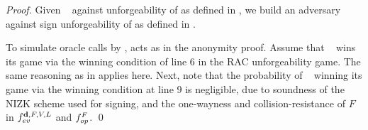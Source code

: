 \begin{proof}
  Given \adv~ against unforgeability of \CUASRAC as defined in
  , we build an adversary \advB against sign
  unforgeability of \CUASGen as defined in .

  To simulate oracle calls by \adv, \advB acts as in the anonymity proof. Assume
  that \adv~ wins its game via the winning condition of line 6 in the RAC
  unforgeability game. The same reasoning as in \CUASAC applies here. Next, note
  that the probability of \adv~ winning its game via the winning condition at
  line 9 is negligible, due to soundness of the NIZK scheme used for signing,
  and the one-wayness and collision-resistance of $F$ in
  $f_{ev}^{\mathbf{d},F,V,L}$ and $f_{op}^{F}$.
  \qed
\end{proof}

